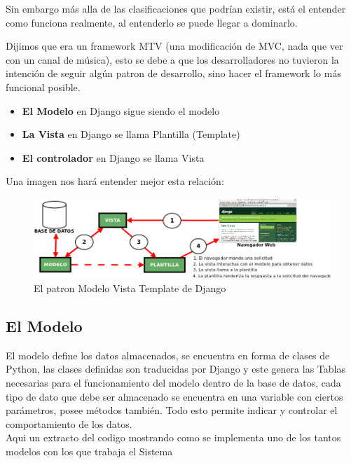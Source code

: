 Sin embargo más alla de las clasificaciones que podr\'ian existir, está el
entender como funciona realmente, al entenderlo se puede llegar a dominarlo.

Dijimos que era un framework MTV (una modificación de MVC, nada que ver con
un canal de m\'usica), esto se debe a que los desarrolladores no tuvieron la
 intención de seguir algún patron de desarrollo, sino hacer el framework lo
más funcional posible.

\begin{itemize}
    \item {\bfseries  El Modelo} en Django sigue siendo el modelo
    \item {\bfseries La Vista} en Django se llama Plantilla (Template)
    \item {\bfseries El controlador} en Django se llama Vista
\end{itemize}

Una imagen nos hará entender mejor esta relación:

\begin{figure}[h]
    \centering
    \includegraphics[scale=0.5]{resourse/esquema-mtv.png}
    \caption{El patron Modelo Vista Template de Django}
    \label{fig:04}
\end{figure}   



\subsection{El Modelo}

El modelo define los datos almacenados, se encuentra en forma de clases de
Python, las clases definidas son traducidas por Django y este genera las Tablas
necesarias para el funcionamiento del modelo dentro de la base de datos, cada
tipo de dato que debe ser almacenado se encuentra en una variable 
con ciertos parámetros, posee métodos también. Todo esto permite indicar y
controlar el comportamiento de los datos.\\[0.1cm]

Aqui un extracto del codigo mostrando como se implementa uno de los tantos
modelos con los que trabaja el Sistema\\[0.3cm]


